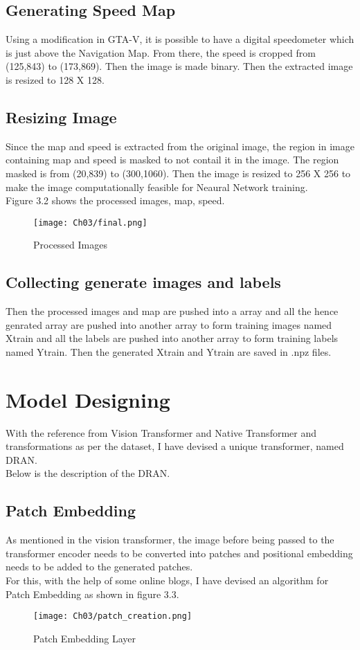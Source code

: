 \subsection{Generating Speed Map}
Using a modification in GTA-V, it is possible to have a digital speedometer which is just above the Navigation Map. From there, the speed is cropped from (125,843) to (173,869). Then the image is made binary. Then the extracted image is resized to 128 X 128.

\subsection{Resizing Image}
Since the map and speed is extracted from the original image, the region in image containing map and speed is masked to not contail it in the image. The region masked is from (20,839) to (300,1060). Then the image is resized to 256 X 256 to make the image computationally feasible for Neaural Network training. 
\\
Figure 3.2 shows the processed images, map, speed.
\begin{figure}[h]
    \centering
    \texttt{[image: Ch03/final.png]}
    \caption{Processed Images}
    \label{figure:2}
\end{figure}
\FloatBarrier

\subsection{Collecting generate images and labels}
Then the processed images and map are pushed into a array and all the hence genrated array are pushed into another array to form training images named Xtrain and all the labels are pushed into another array to form training labels named Ytrain. Then the generated Xtrain and Ytrain are saved in .npz files.

\section{Model Designing}
With the reference from Vision Transformer\cite{dosovitskiy2021image} and Native Transformer\cite{2017arXiv170603762V} and transformations as per the dataset, I have devised a unique transformer, named DRAN.
\\
Below is the description of the DRAN. 

\subsection{Patch Embedding}
As mentioned in the vision transformer, the image before being passed to the transformer encoder needs to be converted into patches and positional embedding needs to be added to the generated patches.
\\
For this, with the help of some online blogs, I have devised an algorithm for Patch Embedding as shown in figure 3.3.
\begin{figure}[h]
    \centering
    \texttt{[image: Ch03/patch\_creation.png]}
    \caption{Patch Embedding Layer}
    \label{figure:3}
\end{figure}
\FloatBarrier

